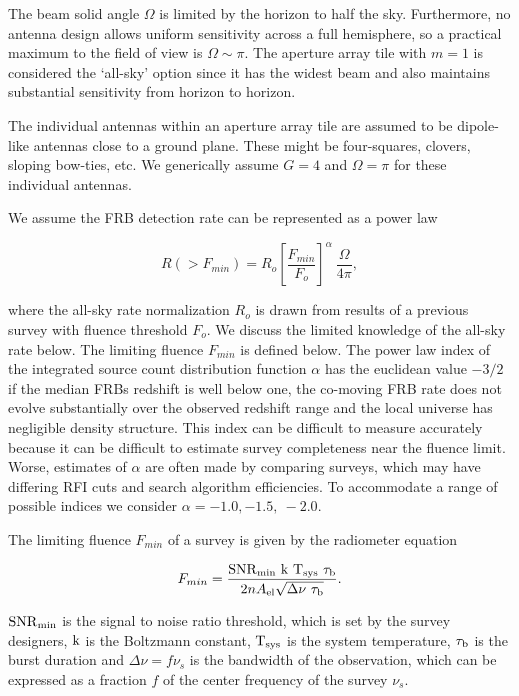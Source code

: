 \documentclass[fleqn,usenatbib]{mnras}
\begin{document}
The beam solid angle $\Omega$ is limited by the horizon to half the sky. Furthermore, no antenna design allows uniform sensitivity across a full hemisphere, so a practical maximum to the field of view is  $\Omega \sim \pi$. The aperture array tile with $m=1$ is considered the `all-sky' option since it has the widest beam and also maintains substantial sensitivity from horizon to horizon.

The individual antennas within an aperture array tile are assumed to be dipole-like antennas close to a ground plane. These might be four-squares, clovers, sloping bow-ties, etc.  We generically assume $G=4$ and $\Omega = \pi$ for these individual antennas.

We assume the FRB detection rate can be represented as a power law 

\begin{equation}
	R(>F_{min}) = R_o \left[ \frac{F_{min} }{F_o} \right] ^\alpha  ~\frac{\Omega}{4 \pi}, 
\end{equation}  

where the all-sky rate normalization $R_o$ is drawn from results of a previous survey with fluence threshold $F_o $. We discuss the limited knowledge of the all-sky rate below. The limiting fluence $F_{min}$ is defined below.
The power law index of the integrated source count distribution function $\alpha $ has the euclidean value $-3/2$ if the median FRBs  redshift is well below one, the co-moving FRB rate does not evolve substantially over the observed redshift range and the local universe has negligible density structure. This index can be difficult to measure accurately because it can be difficult to estimate survey completeness near the fluence limit. Worse, estimates of $\alpha$ are often made by comparing surveys, which may have differing RFI cuts and search algorithm efficiencies.  To accommodate a range of possible indices we consider $\alpha = -1.0, -1.5, ~-2.0$. 

The limiting fluence $F_{min}$ of a survey is given by the radiometer equation 

\begin{equation}
	F_{min} =  \frac{\rm{SNR}_{\rm{min}} ~k ~T_{sys} ~\tau_b}{2 n A_{\rm{el}} \sqrt{\Delta \nu ~\tau_{\rm{b}}}} .
\end{equation}
                
$\rm{SNR}_{\rm{min}}$  is the signal to noise ratio threshold, which is set by the survey designers,
${\rm k }$ is the Boltzmann constant, ${\rm T_{sys}} $  is the system temperature, $\tau_{\rm{b}}$ is the burst duration and $\Delta \nu =f  \nu_s $ is the bandwidth of the observation, which can be expressed as a fraction $f$ of the center frequency of the survey $\nu_s $.
\end{document}
